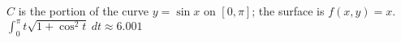 {$C$ is the portion of the curve $y=\sin x$ on $[0,\pi]$; the surface is $f(x,y)=x$.
}
{$\int_0^\pi t\sqrt{1+\cos^2t}\ dt \approx 6.001$
}
